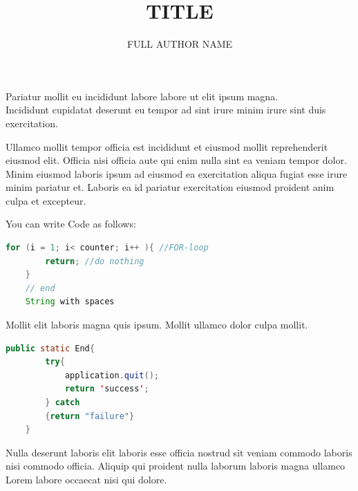 \documentclass
    [   %
        repeatauthor,           %
        shorttitle,             %
        a4paper                 %
    ]{uhhassignment}
\begin{document}
\author[SHORT AUTHOR]{FULL AUTHOR NAME }



\title{TITLE}

\maketitle                  %


\label{tsk: Task1}

Pariatur mollit eu incididunt labore labore ut elit ipsum magna.\\
Incididunt cupidatat deserunt eu tempor ad sint irure minim irure sint duis exercitation.

Ullamco mollit tempor officia est incididunt et eiusmod mollit reprehenderit eiusmod elit. 
Officia nisi officia aute qui enim nulla sint ea veniam tempor dolor.\\
Minim eiusmod laboris ipsum ad eiusmod ea exercitation aliqua fugiat esse irure minim pariatur et.
 Laboris ea id pariatur exercitation eiusmod proident anim culpa et excepteur.

You can write Code as follows:

\begin{lstlisting}[language = Java, firstnumber = 100]
    for (i = 1; i< counter; i++ ){ //FOR-loop
        return; //do nothing
    }
    // end
    String with spaces
\end{lstlisting}

Mollit elit laboris magna quis ipsum. 
Mollit ullamco dolor culpa mollit. 
\begin{lstlisting}[language = Java]
    public static End{
        try{
            application.quit();
            return 'success';
        } catch
        {return "failure"}
    }
\end{lstlisting}
Nulla deserunt laboris elit laboris esse officia nostrud sit veniam commodo laboris nisi commodo officia. 
Aliquip qui proident nulla laborum laboris magna ullamco Lorem labore occaecat nisi qui dolore.
\end{document}
